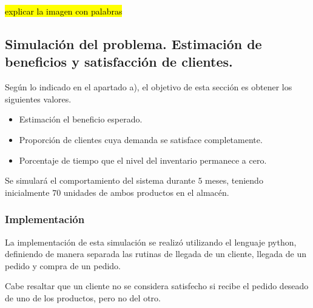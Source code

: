 \documentclass[a4paper,12pt]{article}
\begin{document}
	\hl{explicar la imagen con palabras}\newpage
	
	\subsection{Simulación del problema. Estimación de beneficios y satisfacción de clientes.}
	Según lo indicado en el apartado a), el objetivo de esta sección es obtener los siguientes valores.
	\begin{itemize}
		\item Estimación el beneficio esperado.
		\item Proporción de clientes cuya demanda se satisface completamente.
		\item Porcentaje de tiempo que el nivel del inventario permanece a cero.
	\end{itemize}
	Se simulará el comportamiento del sistema durante $5$ meses, teniendo inicialmente $70$ unidades de ambos productos en el almacén.
	 	
	\subsubsection{Implementación}
	La implementación de esta simulación se realizó utilizando el lenguaje python, definiendo de manera separada las rutinas de llegada de un cliente, llegada de un pedido y compra de un pedido.
	
	Cabe resaltar que un cliente no se considera satisfecho si recibe el pedido deseado de uno de los productos, pero no del otro.
	
\end{document}
